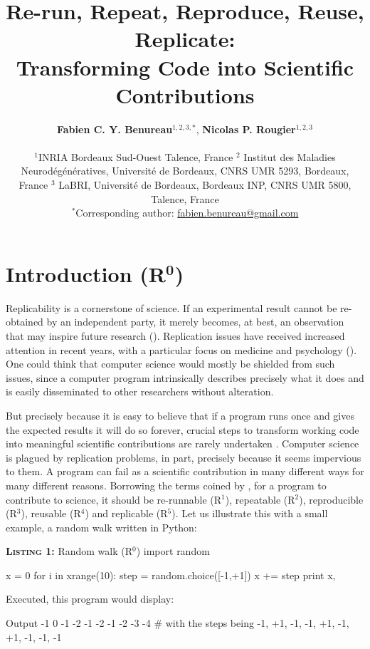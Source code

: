 \documentclass[a4paper,11pt]{article}
\title{Re-run, Repeat, Reproduce, Reuse, Replicate:\\Transforming Code into Scientific Contributions}
\author{
  \textbf{Fabien C. Y. Benureau}$^{1,2,3,*}$,
  \textbf{Nicolas P. Rougier}$^{1,2,3}$\\ \begin{minipage}{\textwidth}
    \begin{center}
      \vspace{2mm}
      $^{1}$INRIA Bordeaux Sud-Ouest Talence, France $^{2}$ Institut des
      Maladies Neurodégénératives, Université de Bordeaux, CNRS UMR 5293,
      Bordeaux, France $^{3}$ LaBRI, Université de Bordeaux, Bordeaux INP, CNRS
      UMR 5800, Talence, France\\
      \vspace{2mm}
      $^{*}$Corresponding author:
      \href{mailto:fabien.benureau@gmail.com}{fabien.benureau@gmail.com}
    \end{center}
  \end{minipage}
}
\date{}
\begin{document}
\maketitle
\section*{Introduction (R$^{\mathbf 0}$)}

Replicability is a cornerstone of science.  If an experimental result cannot be
re-obtained by an independent party, it merely becomes, at best, an observation
that may inspire future research (\cite{Mesirov:2010,osc:2015}). Replication
issues have received increased attention in recent years, with a particular focus on medicine and psychology (\cite{Iqbal:2016}).  One could think
that computer science would mostly be shielded from such issues, since a
computer program intrinsically describes precisely what it does and is easily
disseminated to other researchers without alteration.

But precisely because it is easy to believe that if a program runs once and
gives the expected results it will do so forever, crucial steps to transform
working code into meaningful scientific contributions are rarely undertaken
\citep{Sandve:2013,Schwab:2000}. Computer science is plagued by replication
problems, in part, precisely because it seems impervious to them. A program can
fail as a scientific contribution in many different ways for many different
reasons. Borrowing the terms coined by \citeauthor{Goble:2016}
\citep{Goble:2016}, for a program to contribute to science, it should be
re-runnable (R$^1$), repeatable (R$^2$), reproducible (R$^3$),
reusable (R$^4$) and replicable (R$^5$). Let us illustrate this with a small
example, a random walk written in Python:\\

\noindent \begin{minipage}[c]{\linewidth}
\begin{code}{\textbf{\textsc{Listing 1:}} Random walk (R$^0$)}
import random

x = 0
for i in xrange(10):
    step = random.choice([-1,+1])
    x += step
    print x,
\end{code}
\end{minipage}

Executed, this program would display:
\begin{code}{Output}
-1 0 -1 -2 -1 -2 -1 -2 -3 -4 # with the steps being -1, +1, -1, -1, +1, -1, +1, -1, -1,  -1
\end{code}
\end{document}
